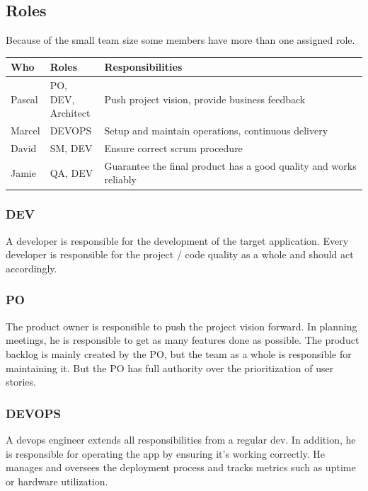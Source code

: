 \subsection*{Roles}

Because of the small team size some members have more than one assigned role.

\begin{table}[H]
    \begin{tabular}{l|l|l}
    \textbf{Who} & \textbf{Roles} & \textbf{Responsibilities} \\
    \hline
    Pascal & \makecell{PO, DEV, \\ Architect} & Push project vision, provide business feedback \\
    Marcel & DEVOPS & Setup and maintain operations, continuous delivery \\
    David  & SM, DEV & Ensure correct scrum procedure \\
    Jamie  & QA, DEV & Guarantee the final product has a good quality and works reliably
    \end{tabular}
\end{table}

\subsubsection*{DEV}
A developer is responsible for the development of the target application.
Every developer is responsible for the project / code quality as a whole and should act accordingly.

\subsubsection*{PO}
The product owner is responsible to push the project vision forward.
In planning meetings, he is responsible to get as many features done as possible.
The product backlog is mainly created by the PO, but the team as a whole is responsible for maintaining it.
But the PO has full authority over the prioritization of user stories.

\subsubsection*{DEVOPS}
A devops engineer extends all responsibilities from a regular dev.
In addition, he is responsible for operating the app by ensuring it's working correctly.
He manages and oversees the deployment process and tracks metrics such as uptime or hardware utilization.

